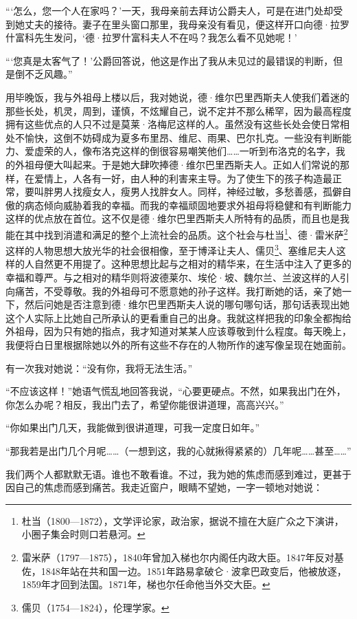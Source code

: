 \par “‘怎么，您一个人在家吗？’一天，我母亲前去拜访公爵夫人，可是在进门处却受到她丈夫的接待。妻子在里头窗口那里，我母亲没有看见，便这样开口向德·拉罗什富科先生发问，‘德·拉罗什富科夫人不在吗？我怎么看不见她呢！’
\par “‘您真是太客气了！’公爵回答说，他这是作出了我从未见过的最错误的判断，但是倒不乏风趣。”
\par 用毕晚饭，我与外祖母上楼以后，我对她说，德·维尔巴里西斯夫人使我们着迷的那些长处，机灵，周到，谨慎，不炫耀自己，说不定并不那么稀罕，因为最高程度拥有这些优点的人只不过是莫莱·洛梅尼这样的人。虽然没有这些长处会使日常相处不愉快，这倒不妨碍成为夏多布里昂、维尼、雨果、巴尔扎克。一些没有判断能力、爱虚荣的人，像布洛克这样的倒很容易嘲笑他们……一听到布洛克的名字，我的外祖母便大叫起来。于是她大肆吹捧德·维尔巴里西斯夫人。正如人们常说的那样，在爱情上，人各有一好，由人种的利害来主导。为了使生下的孩子构造最正常，要叫胖男人找瘦女人，瘦男人找胖女人。同样，神经过敏，多愁善感，孤僻自傲的病态倾向威胁着我的幸福。而我的幸福顽固地要求外祖母将稳健和有判断能力这样的优点放在首位。这不仅是德·维尔巴里西斯夫人所特有的品质，而且也是我能在其中找到消遣和满足的整个上流社会的品质。这个社会与杜当\footnote{杜当（1800—1872），文学评论家，政治家，据说不擅在大庭广众之下演讲，小圈子集会时则口若悬河。}、德·雷米萨\footnote{雷米萨（1797—1875），1840年曾加入梯也尔内阁任内政大臣。1847年反对基佐，1848年站在共和国一边。1851年路易拿破仑·波拿巴政变后，他被放逐，1859年才回到法国。1871年，梯也尔任命他当外交大臣。}这样的人物思想大放光华的社会很相像，至于博泽让夫人、儒贝\footnote{儒贝（1754—1824），伦理学家。}、塞维尼夫人这样的人自然更不用提了。这种思想比起与之相对的精华来，在生活中注入了更多的幸福和尊严。与之相对的精华则将波德莱尔、埃伦·坡、魏尔兰、兰波这样的人引向痛苦，不受尊敬。我的外祖母可不愿意她的孙子这样。我打断她的话，亲了她一下，然后问她是否注意到德·维尔巴里西斯夫人说的哪句哪句话，那句话表现出她这个人实际上比她自己所承认的更看重自己的出身。我就这样把我的印象全都掏给外祖母，因为只有她的指点，我才知道对某某人应该尊敬到什么程度。每天晚上，我便将白日里根据除她以外的所有这些不存在的人物所作的速写像呈现在她面前。
\par 有一次我对她说：“没有你，我将无法生活。”
\par “不应该这样！”她语气慌乱地回答我说，“心要更硬点。不然，如果我出门在外，你怎么办呢？相反，我出门去了，希望你能很讲道理，高高兴兴。”
\par “你如果出门几天，我能做到很讲道理，可我一定度日如年。”
\par “那我若是出门几个月呢……（一想到这，我的心就揪得紧紧的）几年呢……甚至……”
\par 我们两个人都默默无语。谁也不敢看谁。不过，我为她的焦虑而感到难过，更甚于因自己的焦虑而感到痛苦。我走近窗户，眼睛不望她，一字一顿地对她说：
